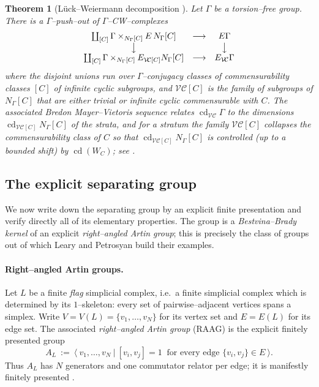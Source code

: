 \documentclass{amsart}
\newtheorem{theorem}{Theorem}
\theoremstyle{definition}
\newcommand{\VC}{\mathcal{V\!C}}
\newcommand{\cd}{\operatorname{cd}}
\newcommand{\AL}{A_{L}}
\begin{document}
\begin{theorem}[Lück--Weiermann decomposition {\cite[Cor.~2.11, \S 5]{LueckWeiermann}}]\label{thm:LW}
Let $\Gamma$ be a torsion--free group. There is a $\Gamma$--push--out of
$\Gamma$--CW--complexes
\[
\begin{array}{ccc}
\coprod_{[C]} \Gamma\times_{N_\Gamma[C]} E\,N_\Gamma[C] & \longrightarrow & E\Gamma\\
\big\downarrow & & \big\downarrow\\
\coprod_{[C]} \Gamma\times_{N_\Gamma[C]} E_{\VC[C]}N_\Gamma[C] & \longrightarrow & E_{\VC}\Gamma
\end{array}
\]
where the disjoint unions run over $\Gamma$--conjugacy classes of commensurability classes
$[C]$ of infinite cyclic subgroups, and $\VC[C]$ is the family of subgroups of $N_\Gamma[C]$
that are either trivial or infinite cyclic commensurable with $C$. The associated Bredon
Mayer--Vietoris sequence relates $\cd_{\VC}\Gamma$ to the dimensions
$\cd_{\VC[C]}N_\Gamma[C]$ of the strata, and for a stratum the family $\VC[C]$ collapses the
commensurability class of $C$ so that $\cd_{\VC[C]}N_\Gamma[C]$ is controlled (up to a bounded
shift) by $\cd(W_C)$; see \cite[\S5]{LueckWeiermann}.
\end{theorem}

\subsection{The explicit separating group}\label{subsec:explicitgroup}

We now write down the separating group by an explicit finite presentation and verify directly
all of its elementary properties. The group is a \emph{Bestvina--Brady kernel} of an explicit
\emph{right--angled Artin group}; this is precisely the class of groups out of which Leary and
Petrosyan build their examples.

\paragraph{Right--angled Artin groups.}
Let $L$ be a finite \emph{flag} simplicial complex, i.e.\ a finite simplicial complex which is
determined by its $1$--skeleton: every set of pairwise--adjacent vertices spans a simplex.
Write $V=V(L)=\{v_1,\dots,v_N\}$ for its vertex set and $E=E(L)$ for its edge set. The
associated \emph{right--angled Artin group} (RAAG) is the explicit finitely presented group
\begin{equation}\label{eq:RAAG}
\AL\ :=\ \big\langle\ v_1,\dots,v_N\ \big|\ [v_i,v_j]=1\ \text{ for every edge } \{v_i,v_j\}\in E\ \big\rangle .
\end{equation}
Thus $\AL$ has $N$ generators and one commutator relator per edge; it is manifestly finitely
presented \cite{Charney}.
\end{document}
